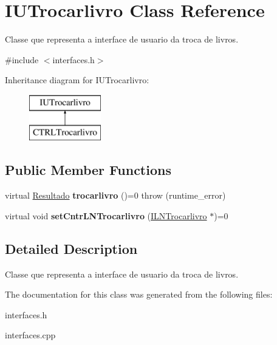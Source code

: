 \hypertarget{classIUTrocarlivro}{}\section{I\+U\+Trocarlivro Class Reference}
\label{classIUTrocarlivro}


Classe que representa a interface de usuario da troca de livros.  




{\ttfamily \#include $<$interfaces.\+h$>$}

Inheritance diagram for I\+U\+Trocarlivro\+:\begin{figure}[H]
\begin{center}
\leavevmode
\includegraphics[height=2.000000cm]{classIUTrocarlivro}
\end{center}
\end{figure}
\subsection*{Public Member Functions}
\begin{DoxyCompactItemize}
\item 
\mbox{\label{classIUTrocarlivro_aedae37ad25cc9af5a18fcb8afd5f987f}} 
virtual \hyperlink{classResultado}{Resultado} {\bfseries trocarlivro} ()=0  throw (runtime\+\_\+error)
\item 
\mbox{\label{classIUTrocarlivro_a4566403f6357e98e442a4d25da3b8837}} 
virtual void {\bfseries set\+Cntr\+L\+N\+Trocarlivro} (\hyperlink{classILNTrocarlivro}{I\+L\+N\+Trocarlivro} $\ast$)=0
\end{DoxyCompactItemize}


\subsection{Detailed Description}
Classe que representa a interface de usuario da troca de livros. 

The documentation for this class was generated from the following files\+:\begin{DoxyCompactItemize}
\item 
interfaces.\+h\item 
interfaces.\+cpp\end{DoxyCompactItemize}

